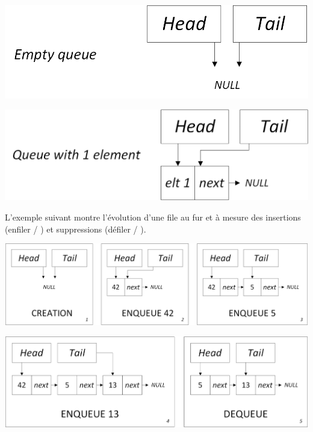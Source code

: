 \begin{center}
\includegraphics[scale=0.75]{Cours/Files_3_Liste_Chainee_Structure_cas_vide_etiquette.png}
\end{center}

\smallskip

\begin{center}
\includegraphics[scale=0.75]{Cours/Files_3_Liste_Chainee_Structure_cas_1_elt_etiquette.png}
\end{center}

\smallskip

L'exemple suivant montre l'évolution d'une file au fur et à mesure des insertions (enfiler / ) et suppressions (défiler / ).\\

\begin{center}
\includegraphics[scale=0.60]{Cours/Files_4_Liste_Chainee_Usage_pack_1.png}
\end{center}

\begin{center}
\includegraphics[scale=0.60]{Cours/Files_4_Liste_Chainee_Usage_pack_2.png}
\end{center}

